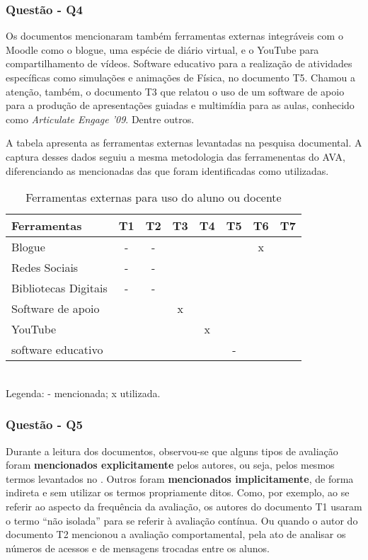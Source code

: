\subsubsection{Questão - Q4}%

Os documentos mencionaram também ferramentas externas integráveis com o Moodle como o blogue, uma espécie de diário virtual, e o YouTube para compartilhamento de vídeos. Software educativo para a realização de atividades específicas como simulações e animações de Física, no documento T5. Chamou a atenção, também, o documento T3 que relatou o uso de um software de apoio para a produção de apresentações guiadas e multimídia para as aulas, conhecido como \emph{Articulate Engage '09}. Dentre outros.

A tabela  apresenta as ferramentas externas levantadas na pesquisa documental. A captura desses dados seguiu a mesma metodologia das ferramenentas do AVA, diferenciando as mencionadas das que foram identificadas como utilizadas.

\begin{table}[ht!]
\footnotesize
\caption{Ferramentas externas para uso do aluno ou docente}
\label{tab:Q4}
\centering
\begin{tabular}{|l|c|c|c|c|c|c|c|}
\addlinespace \hline
    \bigstrut \textbf{Ferramentas}&{T1}&{T2}&{T3}&{T4}&{T5}&{T6}&{T7}\\
\hline
    \bigstrut[t]
    Blogue	                & - & - &   &   &  & x &  \\ \hline
    Redes Sociais	        & -	& - &   &   &  &  &  \\ \hline	
    Bibliotecas Digitais	& - & - &   &   &  &  &  \\ \hline
    Software de apoio	    & 	&   & x &   &  &  &  \\ \hline
    YouTube         	    & 	&   &   & x &  &  &  \\ \hline    
    \bigstrut[b]
    software educativo      & 	&   &   &  & - &  &  \\
\hline
\end{tabular}
\\Legenda: - mencionada; x utilizada.
\end{table}

\subsubsection{Questão - Q5}%
Durante a leitura dos documentos, observou-se que alguns tipos de avaliação foram \textbf{mencionados explicitamente} pelos autores, ou seja, pelos mesmos termos levantados no . Outros foram \textbf{mencionados implicitamente}, de forma indireta e sem utilizar os termos propriamente ditos. Como, por exemplo, ao se referir ao aspecto da frequência da avaliação, os autores do documento T1 usaram o termo ``não isolada'' para se referir à avaliação contínua. Ou quando o autor do documento T2 mencionou a avaliação comportamental, pela ato de analisar os números de acessos e de mensagens trocadas entre os alunos.

